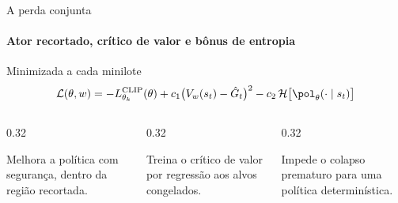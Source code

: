 \documentclass[aspectratio=169, 11pt]{beamer}
\begin{document}
\begin{frame}{A perda conjunta}
  \framesubtitle{Ator recortado, crítico de valor e bônus de entropia}

  \begin{teobox}{Minimizada a cada minilote}
    \[
      \mathcal{L}(\theta,w) = -L^{\mathrm{CLIP}}_{\theta_k}(\theta) + c_1\big(V_w(s_t) - \hat G_t\big)^2
        - c_2\,\mathcal{H}\big[\pol_\theta(\cdot\mid s_t)\big]
    \]
  \end{teobox}

  \begin{columns}[T]
    \begin{column}{0.32\textwidth}
      \begin{ideiabox}[title={Ator: $-L^{\mathrm{CLIP}}$}]
        Melhora a política com segurança, dentro da região recortada.
      \end{ideiabox}
    \end{column}
    \begin{column}{0.32\textwidth}
      \begin{ideiabox}[title={Crítico: $c_1(V - \hat G_t)^2$}]
        Treina o crítico de valor por regressão aos alvos congelados.
      \end{ideiabox}
    \end{column}
    \begin{column}{0.32\textwidth}
      \begin{ideiabox}[title={Exploração: $-c_2\,\mathcal{H}[\pol_\theta]$}]
        Impede o colapso prematuro para uma política determinística.
      \end{ideiabox}
    \end{column}
  \end{columns}
\end{frame}
\end{document}
